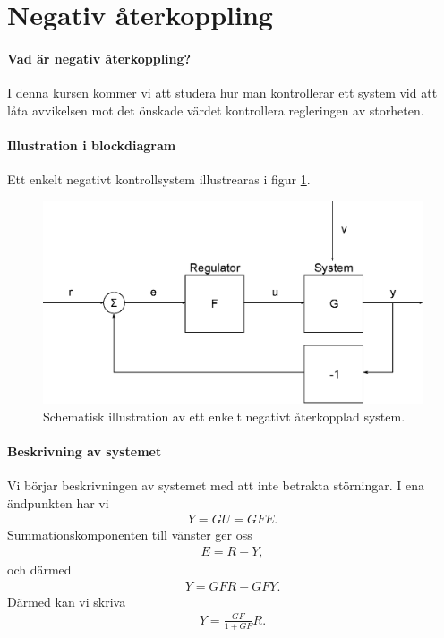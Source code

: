 \section{Negativ återkoppling}

\paragraph{Vad är negativ återkoppling?}
I denna kursen kommer vi att studera hur man kontrollerar ett system vid att låta avvikelsen mot det önskade värdet kontrollera regleringen av storheten.

\paragraph{Illustration i blockdiagram}
Ett enkelt negativt kontrollsystem illustrearas i figur \ref{fig:negative_feedback}.

\begin{figure}[!ht]
	\centering
	\includegraphics[width = \textwidth]{./Images/negative_feedback.eps}
	\caption{Schematisk illustration av ett enkelt negativt återkopplad system.}
	\label{fig:negative_feedback}
\end{figure}

\paragraph{Beskrivning av systemet}
Vi börjar beskrivningen av systemet med att inte betrakta störningar. I ena ändpunkten har vi
\begin{align*}
	Y = GU = GFE.
\end{align*}
Summationskomponenten till vänster ger oss
\begin{align*}
	E = R - Y,
\end{align*}
och därmed
\begin{align*}
	Y = GFR - GFY.
\end{align*}
Därmed kan vi skriva
\begin{align*}
	Y = \frac{GF}{1 + GF}R.
\end{align*}

